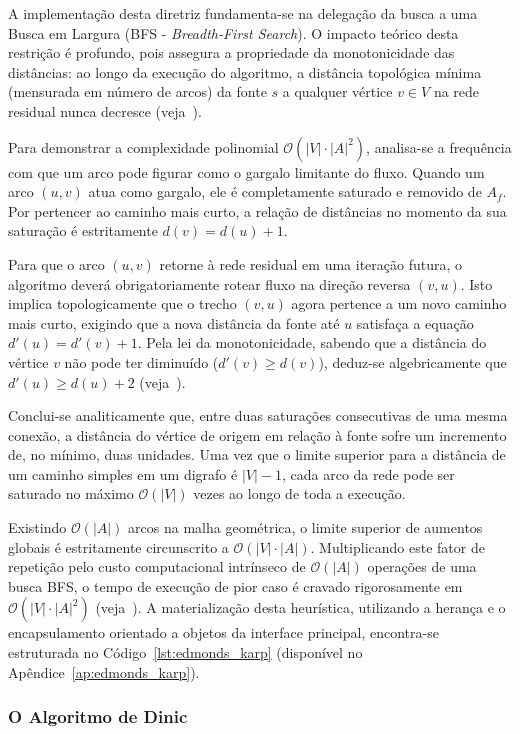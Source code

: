 \documentclass[12pt,a4paper]{article}
\begin{document}
A implementação desta diretriz fundamenta-se na delegação da busca a uma Busca em Largura (BFS - \textit{Breadth-First Search}). O impacto teórico desta restrição é profundo, pois assegura a propriedade da monotonicidade das distâncias: ao longo da execução do algoritmo, a distância topológica mínima (mensurada em número de arcos) da fonte $s$ a qualquer vértice $v \in V$ na rede residual nunca decresce (veja~\cite{cook1998combinatorial}).

Para demonstrar a complexidade polinomial $\mathcal{O}(|V| \cdot |A|^2)$, analisa-se a frequência com que um arco pode figurar como o gargalo limitante do fluxo. Quando um arco $(u,v)$ atua como gargalo, ele é completamente saturado e removido de $A_f$. Por pertencer ao caminho mais curto, a relação de distâncias no momento da sua saturação é estritamente $d(v) = d(u) + 1$.

Para que o arco $(u,v)$ retorne à rede residual em uma iteração futura, o algoritmo deverá obrigatoriamente rotear fluxo na direção reversa $(v,u)$. Isto implica topologicamente que o trecho $(v,u)$ agora pertence a um novo caminho mais curto, exigindo que a nova distância da fonte até $u$ satisfaça a equação $d'(u) = d'(v) + 1$. Pela lei da monotonicidade, sabendo que a distância do vértice $v$ não pode ter diminuído ($d'(v) \ge d(v)$), deduz-se algebricamente que $d'(u) \ge d(u) + 2$ (veja~\cite{ahuja1993network}).

Conclui-se analiticamente que, entre duas saturações consecutivas de uma mesma conexão, a distância do vértice de origem em relação à fonte sofre um incremento de, no mínimo, duas unidades. Uma vez que o limite superior para a distância de um caminho simples em um digrafo é $|V| - 1$, cada arco da rede pode ser saturado no máximo $\mathcal{O}(|V|)$ vezes ao longo de toda a execução.

Existindo $\mathcal{O}(|A|)$ arcos na malha geométrica, o limite superior de aumentos globais é estritamente circunscrito a $\mathcal{O}(|V| \cdot |A|)$. Multiplicando este fator de repetição pelo custo computacional intrínseco de $\mathcal{O}(|A|)$ operações de uma busca BFS, o tempo de execução de pior caso é cravado rigorosamente em $\mathcal{O}(|V| \cdot |A|^2)$ (veja~\cite{korte2018combinatorial}). A materialização desta heurística, utilizando a herança e o encapsulamento orientado a objetos da interface principal, encontra-se estruturada no Código~\ref{lst:edmonds_karp} (disponível no Apêndice~\ref{ap:edmonds_karp}).

\subsubsection{O Algoritmo de Dinic}
\end{document}

